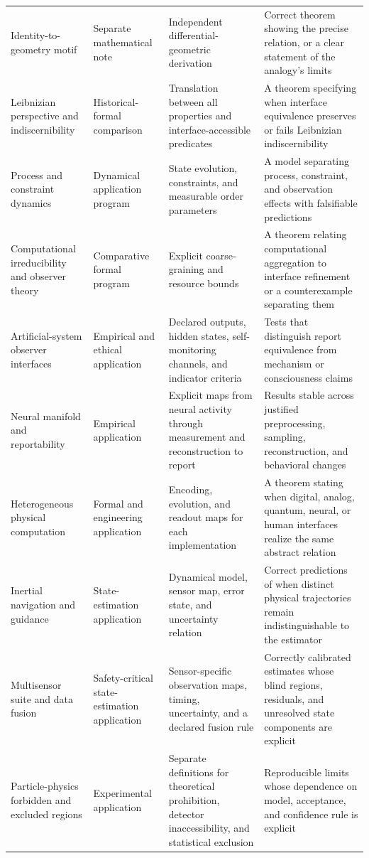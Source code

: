 \begin{longtable}{@{}>{\raggedright\arraybackslash}p{}>{\raggedright\arraybackslash}p{}>{\raggedright\arraybackslash}p{}>{\raggedright\arraybackslash}p{}@{}}
Identity-to-geometry motif & Separate mathematical note & Independent differential-geometric derivation & Correct theorem showing the precise relation, or a clear statement of the analogy's limits \\
Leibnizian perspective and indiscernibility & Historical-formal comparison & Translation between all properties and interface-accessible predicates & A theorem specifying when interface equivalence preserves or fails Leibnizian indiscernibility \\
Process and constraint dynamics & Dynamical application program & State evolution, constraints, and measurable order parameters & A model separating process, constraint, and observation effects with falsifiable predictions \\
Computational irreducibility and observer theory & Comparative formal program & Explicit coarse-graining and resource bounds & A theorem relating computational aggregation to interface refinement or a counterexample separating them \\
Artificial-system observer interfaces & Empirical and ethical application & Declared outputs, hidden states, self-monitoring channels, and indicator criteria & Tests that distinguish report equivalence from mechanism or consciousness claims \\
Neural manifold and reportability & Empirical application & Explicit maps from neural activity through measurement and reconstruction to report & Results stable across justified preprocessing, sampling, reconstruction, and behavioral changes \\
Heterogeneous physical computation & Formal and engineering application & Encoding, evolution, and readout maps for each implementation & A theorem stating when digital, analog, quantum, neural, or human interfaces realize the same abstract relation \\
Inertial navigation and guidance & State-estimation application & Dynamical model, sensor map, error state, and uncertainty relation & Correct predictions of when distinct physical trajectories remain indistinguishable to the estimator \\
Multisensor suite and data fusion & Safety-critical state-estimation application & Sensor-specific observation maps, timing, uncertainty, and a declared fusion rule & Correctly calibrated estimates whose blind regions, residuals, and unresolved state components are explicit \\
Particle-physics forbidden and excluded regions & Experimental application & Separate definitions for theoretical prohibition, detector inaccessibility, and statistical exclusion & Reproducible limits whose dependence on model, acceptance, and confidence rule is explicit \\
\bottomrule
\end{longtable}
\endgroup


